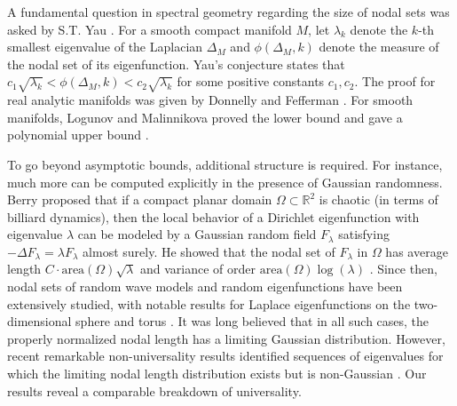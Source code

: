 \documentclass[reqno]{amsart}
\numberwithin{equation}{section}
\newcommand\R{\mathbb{R}}
\newcommand\Z{\mathbb{Z}}
\begin{document}
A fundamental question in spectral geometry regarding the size of nodal sets was asked by S.T. Yau \cite{Yau1982}. For a smooth compact manifold $M$, let  $\lambda_{k}$ denote the $k$-th smallest eigenvalue of the Laplacian $\Delta_M$ and $\phi(\Delta_M,k)$ denote the measure of the nodal set of its eigenfunction. Yau's conjecture states that $c_1\sqrt{\lambda_{k}}<\phi(\Delta_M,k)<c_2\sqrt{\lambda_{k}}$ for some positive constants $c_1,c_2$.  The proof for real analytic manifolds was given by Donnelly and Fefferman \cite{donnelly1988nodal}. For smooth manifolds, Logunov and Malinnikova proved the lower bound and gave a polynomial upper bound \cite{Logunov2018Lower,Logunov2018Upper,LogunovMalinnikova2018}. 

To go beyond asymptotic bounds, additional structure is required. For instance, much more can be computed explicitly in the presence of Gaussian randomness. Berry \cite{berry2002statistics} proposed that if a compact planar domain $\Omega \subset \mathbb{R}^2$ is chaotic (in terms of billiard dynamics), then the local behavior of a Dirichlet eigenfunction with eigenvalue $\lambda$ can be modeled by a Gaussian random field $F_{\lambda}$ satisfying $-\Delta F_{\lambda} = \lambda F_{\lambda}$ almost surely. He showed that the nodal set of $F_{\lambda}$ in $\Omega$ has average length $C \cdot \mathrm{area}(\Omega)\sqrt{\lambda}$ and variance of order $\mathrm{area}(\Omega)\log(\lambda)$ \cite{berry2002statistics}. Since then, nodal sets of random wave models and random eigenfunctions have been extensively studied, with notable results for Laplace eigenfunctions on the two-dimensional sphere \cite{nazarov2009number,nazarov2020fluctuations} and torus \cite{rudnick2008volume,Wigman2013nodal}. It was long believed that in all such cases, the properly normalized nodal length has a limiting Gaussian distribution. However, recent remarkable non-universality results identified sequences of eigenvalues for which the limiting nodal length distribution exists but is non-Gaussian \cite{marinucci2016non,Nourdin2019}. Our results reveal a comparable breakdown of universality.

\end{document}
